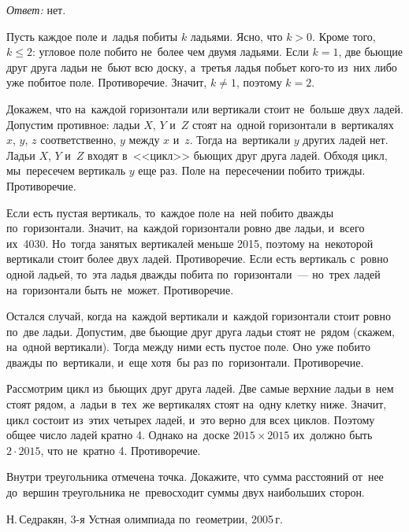 \ifincludesolutions
\emph{Ответ:} нет.
\par
Пусть каждое поле и~ладья побиты $k$ ладьями.
Ясно, что $k > 0$.
Кроме того, $k \leq 2$: угловое поле побито не~более чем двумя ладьями.
Если $k = 1$, две бьющие друг друга ладьи не~бьют всю доску, а~третья ладья
побьет кого-то из~них либо уже побитое поле.
Противоречие.
Значит, $k \neq 1$, поэтому $k = 2$.
\par
Докажем, что на~каждой горизонтали или вертикали стоит не~больше двух ладей.
Допустим противное: ладьи $X$, $Y$ и~$Z$ стоят на~одной горизонтали
в~вертикалях $x$, $y$, $z$ соответственно, $y$ между $x$ и~$z$.
Тогда на~вертикали $y$ других ладей нет.
Ладьи $X$, $Y$ и~$Z$ входят в~<<цикл>> бьющих друг друга ладей.
Обходя цикл, мы~пересечем вертикаль $y$ еще раз.
Поле на~пересечении побито трижды.
Противоречие.
\par
Если есть пустая вертикаль, то~каждое поле на~ней побито дважды по~горизонтали.
Значит, на~каждой горизонтали ровно две ладьи, и~всего их~4030.
Но~тогда занятых вертикалей меньше 2015, поэтому на~некоторой вертикали стоит
более двух ладей.
Противоречие.
Если есть вертикаль с~ровно одной ладьей, то~эта ладья дважды побита
по~горизонтали~--- но~трех ладей на~горизонтали быть не~может.
Противоречие.
\par
Остался случай, когда на~каждой вертикали и~каждой горизонтали стоит ровно
по~две ладьи.
Допустим, две бьющие друг друга ладьи стоят не~рядом (скажем, на~одной
вертикали).
Тогда между ними есть пустое поле.
Оно уже побито дважды по~вертикали, и~еще хотя~бы раз по~горизонтали.
Противоречие.
\par
Рассмотрим цикл из~бьющих друг друга ладей.
Две самые верхние ладьи в~нем стоят рядом, а~ладьи в~тех~же вертикалях стоят
на~одну клетку ниже.
Значит, цикл состоит из~этих четырех ладей, и~это верно для всех циклов.
Поэтому общее число ладей кратно 4.
Однако на~доске $2015 \times 2015$ их~должно быть $2 \cdot 2015$, что
не~кратно 4.
Противоречие.
\fi %

\begin{problems}

\item
\ifincludesolutions\label{olympiad/g9-1/r1:n4:problem}\fi
Внутри треугольника отмечена точка.
Докажите, что сумма расстояний от~нее до~вершин треугольника не~превосходит
суммы двух наибольших сторон.
\begingroup\em\small\par\strut\hfill
    Н.\,Седракян, 3-я Устная олимпиада по~геометрии, 2005\,г.
\endgroup
\end{problems}

